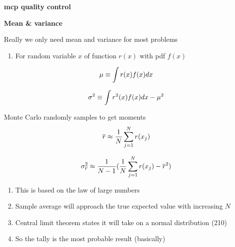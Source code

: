 \documentclass[aspectratio=1610,pdftex,dvipsnames,compress,xcolor={dvipsnames}]{beamer}
\newcommand{\acs}{\acrshort} %
\begin{document}
\begin{frame}[plain]{}
    \centering\LARGE\textbf{\acs{mcp} quality control}
\end{frame}


\begin{frame}[plain]{}
    \centering\LARGE\textbf{Mean \& variance}
\end{frame}


\addtocounter{framenumber}{-2} 
\begin{frame}{Really we only need mean and variance for most problems}
    \begin{enumerate}[series=outerlist,topsep=0pt,itemsep=21pt,leftmargin=*,label=(\arabic*)]
        \item[]For random variable $x$ of function $r(x)$ with pdf $f(x)$
    \end{enumerate}

    \vspace*{\fill}

    \begin{equation}
        \LARGE
         \mu \equiv \int r(x)f(x)dx
    \end{equation}

    \begin{equation}
        \LARGE
        \sigma^2 \equiv \int r^2(x)f(x)dx -\mu^2
    \end{equation}
\end{frame}


\begin{frame}{Monte Carlo randomly samples to get moments}
    \begin{equation}
        \LARGE
        \overline{r} \approx \frac{1}{N}\sum_{j=1}^N r(x_j)
    \end{equation}

    \begin{equation}
        \LARGE
        \sigma^2_{\overline{r}} \approx \frac{1}{N-1}(\frac{1}{N}\sum_{j=1}^N r(x_j) - \overline{r}^2)
    \end{equation}

    \vspace*{\fill}

    \begin{enumerate}[series=outerlist,topsep=0pt,itemsep=18pt,leftmargin=*,label=(\arabic*)]
        \item[]This is based on the law of large numbers  
        \item[]Sample average will approach the true expected value with increasing $N$ 
        \item[]Central limit theorem states it will take on a normal distribution (210)
        \item[]So the tally is the most probable result (basically)
    \end{enumerate}
\end{frame}
\end{document}
